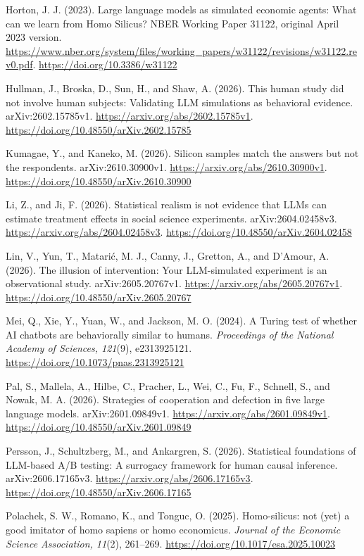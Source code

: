 \documentclass[11pt]{article}
\begin{document}
Horton, J. J. (2023). Large language models as simulated economic
agents: What can we learn from Homo Silicus? NBER Working Paper 31122,
original April 2023 version.
\url{https://www.nber.org/system/files/working_papers/w31122/revisions/w31122.rev0.pdf}.
\url{https://doi.org/10.3386/w31122}

Hullman, J., Broska, D., Sun, H., and Shaw, A. (2026). This human study
did not involve human subjects: Validating LLM simulations as behavioral
evidence. arXiv:2602.15785v1. \url{https://arxiv.org/abs/2602.15785v1}.
\url{https://doi.org/10.48550/arXiv.2602.15785}

Kumagae, Y., and Kaneko, M. (2026). Silicon samples match the answers
but not the respondents. arXiv:2610.30900v1.
\url{https://arxiv.org/abs/2610.30900v1}.
\url{https://doi.org/10.48550/arXiv.2610.30900}

Li, Z., and Ji, F. (2026). Statistical realism is not evidence that LLMs
can estimate treatment effects in social science experiments.
arXiv:2604.02458v3. \url{https://arxiv.org/abs/2604.02458v3}.
\url{https://doi.org/10.48550/arXiv.2604.02458}

Lin, V., Yun, T., Matarić, M. J., Canny, J., Gretton, A., and D'Amour,
A. (2026). The illusion of intervention: Your LLM-simulated experiment
is an observational study. arXiv:2605.20767v1.
\url{https://arxiv.org/abs/2605.20767v1}.
\url{https://doi.org/10.48550/arXiv.2605.20767}

Mei, Q., Xie, Y., Yuan, W., and Jackson, M. O. (2024). A Turing test of
whether AI chatbots are behaviorally similar to humans.
\emph{Proceedings of the National Academy of Sciences, 121}(9),
e2313925121. \url{https://doi.org/10.1073/pnas.2313925121}

Pal, S., Mallela, A., Hilbe, C., Pracher, L., Wei, C., Fu, F., Schnell,
S., and Nowak, M. A. (2026). Strategies of cooperation and defection in
five large language models. arXiv:2601.09849v1.
\url{https://arxiv.org/abs/2601.09849v1}.
\url{https://doi.org/10.48550/arXiv.2601.09849}

Persson, J., Schultzberg, M., and Ankargren, S. (2026). Statistical
foundations of LLM-based A/B testing: A surrogacy framework for human
causal inference. arXiv:2606.17165v3.
\url{https://arxiv.org/abs/2606.17165v3}.
\url{https://doi.org/10.48550/arXiv.2606.17165}

Polachek, S. W., Romano, K., and Tonguc, O. (2025). Homo-silicus: not
(yet) a good imitator of homo sapiens or homo economicus. \emph{Journal
of the Economic Science Association, 11}(2), 261--269.
\url{https://doi.org/10.1017/esa.2025.10023}
\endgroup
\end{document}
